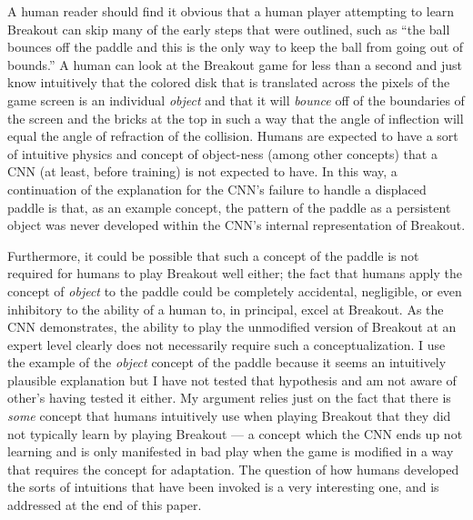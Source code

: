 \documentclass{article}
\renewcommand{\it}{\textit}
\begin{document}
A human reader should find it obvious that a human player attempting to learn Breakout can skip many of the early steps that were outlined, such as ``the ball bounces off the paddle and this is the only way to keep the ball from going out of bounds.''
A human can look at the Breakout game for less than a second and just know intuitively that the colored disk that is translated across the pixels of the game screen is an individual \it{object} and that it will \it{bounce} off of the boundaries of the screen and the bricks at the top in such a way that the angle of inflection will equal the angle of refraction of the collision.
Humans are expected to have a sort of intuitive physics and concept of object-ness (among other concepts) that a CNN (at least, before training) is not expected to have.
In this way, a continuation of the explanation for the CNN's failure to handle a displaced paddle is that, as an example concept, the pattern of the paddle as a persistent object was never developed within the CNN's internal representation of Breakout.

Furthermore, it could be possible that such a concept of the paddle is not required for humans to play Breakout well either; the fact that humans apply the concept of \it{object} to the paddle could be completely accidental, negligible, or even inhibitory to the ability of a human to, in principal, excel at Breakout.
As the CNN demonstrates, the ability to play the unmodified version of Breakout at an expert level clearly does not necessarily require such a conceptualization.
I use the example of the \it{object} concept of the paddle because it seems an intuitively plausible explanation but I have not tested that hypothesis and am not aware of other's having tested it either. My argument relies just on the fact that there is \it{some} concept that humans intuitively use when playing Breakout that they did not typically learn by playing Breakout --- a concept which the CNN ends up not learning and is only manifested in bad play when the game is modified in a way that requires the concept for adaptation.
The question of how humans developed the sorts of intuitions that have been invoked is a very interesting one, and is addressed at the end of this paper.
\end{document}
